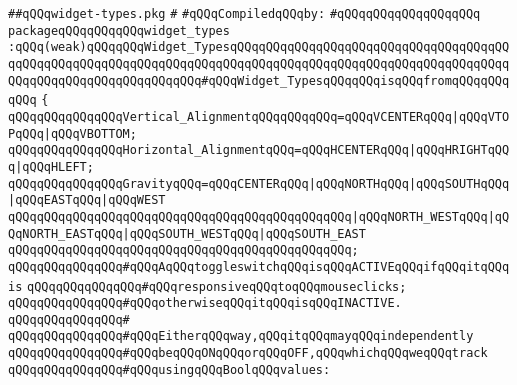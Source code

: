 \label{src/lib/x-kit/widget/old/basic/widget-types.pkg}
\verb|##qQQqwidget-types.pkg|\newline
\verb|#|\newline
\newline
\verb|#qQQqCompiledqQQqby:|\newline
\verb|#qQQqqQQqqQQqqQQqqQQq|\newline
\newline
\verb|packageqQQqqQQqqQQqwidget_types|\newline
\verb|:qQQq(weak)qQQqqQQqWidget_TypesqQQqqQQqqQQqqQQqqQQqqQQqqQQqqQQqqQQqqQQqqQQqqQQqqQQqqQQqqQQqqQQqqQQqqQQqqQQqqQQqqQQqqQQqqQQqqQQqqQQqqQQqqQQqqQQqqQQqqQQqqQQqqQQqqQQqqQQq#qQQqWidget_TypesqQQqqQQqisqQQqfromqQQqqQQqqQQq|\newline
\verb|{|\newline
\verb|qQQqqQQqqQQqqQQqVertical_AlignmentqQQqqQQqqQQq=qQQqVCENTERqQQq|\verb#|qQQqVTOPqQQq|qQQqVBOTTOM;#\newline
\verb|qQQqqQQqqQQqqQQqHorizontal_AlignmentqQQq=qQQqHCENTERqQQq|\verb#|qQQqHRIGHTqQQq|qQQqHLEFT;#\newline
\newline
\verb|qQQqqQQqqQQqqQQqGravityqQQq=qQQqCENTERqQQq|\verb#|qQQqNORTHqQQq|qQQqSOUTHqQQq|qQQqEASTqQQq|qQQqWEST#\newline
\verb|qQQqqQQqqQQqqQQqqQQqqQQqqQQqqQQqqQQqqQQqqQQqqQQq|\verb#|qQQqNORTH_WESTqQQq|qQQqNORTH_EASTqQQq|qQQqSOUTH_WESTqQQq|qQQqSOUTH_EAST#\newline
\verb|qQQqqQQqqQQqqQQqqQQqqQQqqQQqqQQqqQQqqQQqqQQqqQQq;|\newline
\newline
\verb|qQQqqQQqqQQqqQQq#qQQqAqQQqtoggleswitchqQQqisqQQqACTIVEqQQqifqQQqitqQQqis|\newline
\verb|qQQqqQQqqQQqqQQq#qQQqresponsiveqQQqtoqQQqmouseclicks;|\newline
\verb|qQQqqQQqqQQqqQQq#qQQqotherwiseqQQqitqQQqisqQQqINACTIVE.|\newline
\verb|qQQqqQQqqQQqqQQq#|\newline
\verb|qQQqqQQqqQQqqQQq#qQQqEitherqQQqway,qQQqitqQQqmayqQQqindependently|\newline
\verb|qQQqqQQqqQQqqQQq#qQQqbeqQQqONqQQqorqQQqOFF,qQQqwhichqQQqweqQQqtrack|\newline
\verb|qQQqqQQqqQQqqQQq#qQQqusingqQQqBoolqQQqvalues:|\newline
